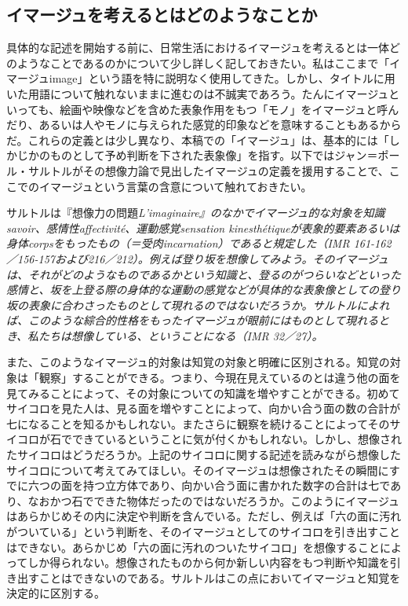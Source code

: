 \documentclass[b5j,twoside,twocolumn]{utarticle}
\begin{document}
\subsection{イマージュを考えるとはどのようなことか}
具体的な記述を開始する前に、日常生活におけるイマージュを考えるとは一体どのようなことであるのかについて少し詳しく記しておきたい。私はここまで「イマージュimage」という語を特に説明なく使用してきた。しかし、タイトルに用いた用語について触れないままに進むのは不誠実であろう。たんにイマージュといっても、絵画や映像などを含めた表象作用をもつ「モノ」をイマージュと呼んだり、あるいは人やモノに与えられた感覚的印象などを意味することもあるからだ。これらの定義とは少し異なり、本稿での「イマージュ」は、基本的には「しかじかのものとして予め判断を下された表象像」を指す。以下ではジャン＝ポール・サルトルがその想像力論で見出したイマージュの定義を援用することで、ここでのイマージュという言葉の含意について触れておきたい。


サルトルは『想像力の問題\sl{L'imaginaire}\rm』のなかでイマージュ的な対象を知識savoir、感情性affectivité、運動感覚sensation kinesthétiqueが表象的要素あるいは身体corpsをもったもの（＝受肉incarnation）であると規定した（IMR 161-162／156-157および216／212）。例えば登り坂を想像してみよう。そのイマージュは、それがどのようなものであるかという知識と、登るのがつらいなどといった感情と、坂を上登る際の身体的な運動の感覚などが具体的な表象像としての登り坂の表象に合わさったものとして現れるのではないだろうか。サルトルによれば、このような綜合的性格をもったイマージュが眼前にはものとして現れるとき、私たちは想像している、ということになる（IMR 32／27）。


また、このようなイマージュ的対象は知覚の対象と明確に区別される。知覚の対象は「観察」することができる。つまり、今現在見えているのとは違う他の面を見てみることによって、その対象についての知識を増やすことができる。初めてサイコロを見た人は、見る面を増やすことによって、向かい合う面の数の合計が七になることを知るかもしれない。またさらに観察を続けることによってそのサイコロが石でできているということに気が付くかもしれない。しかし、想像されたサイコロはどうだろうか。上記のサイコロに関する記述を読みながら想像したサイコロについて考えてみてほしい。そのイマージュは想像されたその瞬間にすでに六つの面を持つ立方体であり、向かい合う面に書かれた数字の合計は七であり、なおかつ石でできた物体だったのではないだろうか。このようにイマージュはあらかじめその内に決定や判断を含んでいる。ただし、例えば「六の面に汚れがついている」という判断を、そのイマージュとしてのサイコロを引き出すことはできない。あらかじめ「六の面に汚れのついたサイコロ」を想像することによってしか得られない。想像されたものから何か新しい内容をもつ判断や知識を引き出すことはできないのである。サルトルはこの点においてイマージュと知覚を決定的に区別する。
\end{document}
